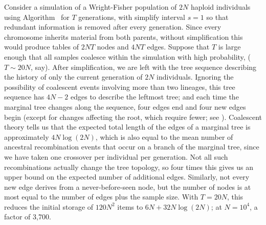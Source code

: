 \documentclass{article}
\begin{document}
Consider a simulation of a Wright-Fisher population of $2N$ haploid individuals
using Algorithm~ for $T$ generations,
with simplify interval $s = 1$ so that redundant information is removed after every generation.
Since every chromosome inherits material from both parents,
without simplification this would produce tables of
$2NT$ nodes and
$4NT$ edges.
Suppose that $T$ is large enough that all samples coalesce within the simulation with high probability,
($T \sim 20N$, say).
After simplification, we are left with the tree sequence describing the history
of only the current generation of $2N$ individuals.
Ignoring the possibility of coalescent events involving more than two lineages, this tree sequence has $4N-2$ edges to describe the leftmost tree;
and each time the marginal tree changes along the sequence,
four edges end and four new edges begin
(except for changes affecting the root, which require fewer; see \citet{kelleher2016efficient}).
Coalescent theory tells us that
the expected total length of the edges of a marginal tree is approximately $4N\log(2N)$,
which is also equal to the mean number of ancestral recombination events that occur on a branch of the marginal tree,
since we have taken one crossover per individual per generation.
Not all such recombinations actually change the tree topology,
so four times this gives us an upper bound on the expected number of additional edges.
Similarly, not every new edge derives from a never-before-seen node,
but the number of nodes is at most equal to the number of edges plus the sample size.
With $T=20N$, this reduces the initial storage of $120 N^2$ items to
$6N + 32 N \log(2N)$;
at $N=10^4$, a factor of 3,700.
\end{document}

